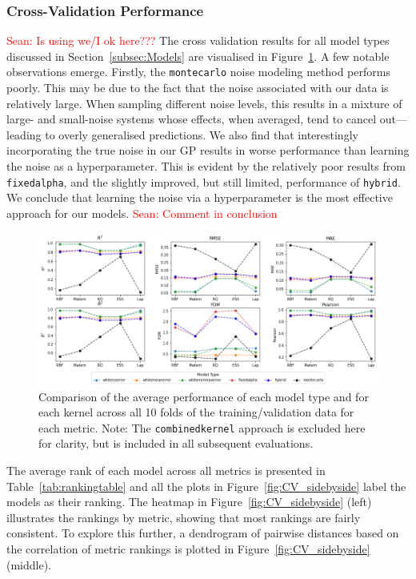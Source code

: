 \documentclass[12pt]{article}
\newcommand{\Sean}[1]{{\textcolor{red}{{Sean: #1}} }}
\begin{document}
\subsubsection*{Cross-Validation Performance}
\Sean{Is using we/I ok here???}
The cross validation results for all model types discussed in Section~\ref{subsec:Models} are visualised in Figure~\ref{fig:broad_comparison}. A few notable observations emerge. Firstly, the \texttt{montecarlo} noise modeling method performs poorly.
This may be due to the fact that the noise associated with our data is relatively large. When sampling different noise levels, this results in a mixture of large- and small-noise systems whose effects, when averaged, tend to cancel out—leading to overly generalised predictions.
We also find that interestingly incorporating the true noise in our GP results in worse performance than learning the noise as a hyperparameter.
This is evident by the relatively poor results from \texttt{fixedalpha}, and the slightly improved, but still limited, performance of \texttt{hybrid}.
We conclude that learning the noise via a hyperparameter is the most effective approach for our models. \Sean{Comment in conclusion}
\begin{figure}[H]
    \centering
    \includegraphics[width=\textwidth]{LatexPlots/CV_plots/metrics_compared.png}
    \caption{Comparison of the average performance of each model type and for each kernel across all 10 folds of the training/validation data for each metric. Note: The \texttt{combinedkernel} approach is excluded here for clarity, but is included in all subsequent evaluations.}
    \label{fig:broad_comparison}
\end{figure}
The average rank of each model across all metrics is presented in Table~\ref{tab:rankingtable} and all the plots in Figure~\ref{fig:CV_sidebyside} label the models as their ranking.
The heatmap in Figure~\ref{fig:CV_sidebyside} (left) illustrates the rankings by metric, showing that most rankings are fairly consistent. To explore this further, a dendrogram of pairwise distances based on the correlation of metric rankings is plotted in Figure~\ref{fig:CV_sidebyside} (middle).
\end{document}
